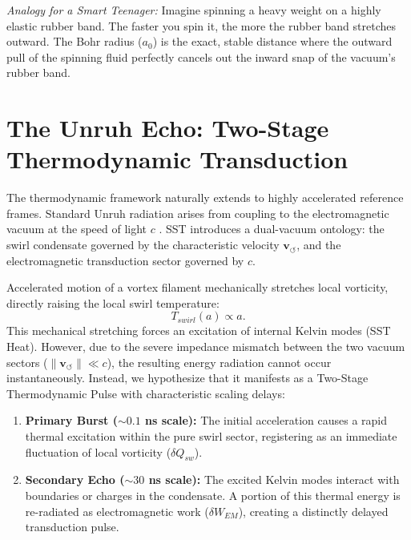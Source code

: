 \documentclass[11pt, a4paper]{article}
\newcommand{\vswirl}{\mathbf{v}_{\!\boldsymbol{\circlearrowleft}}}
\begin{document}
        \emph{Analogy for a Smart Teenager:} Imagine spinning a heavy weight on a highly elastic rubber band. The faster you spin it, the more the rubber band stretches outward. The Bohr radius ($a_0$) is the exact, stable distance where the outward pull of the spinning fluid perfectly cancels out the inward snap of the vacuum's rubber band.

        \section{The Unruh Echo: Two-Stage Thermodynamic Transduction}
        \label{sec:unruh_echo}
        
        The thermodynamic framework naturally extends to highly accelerated reference frames. Standard Unruh radiation arises from coupling to the electromagnetic vacuum at the speed of light $c$ \cite{Unruh1976}. SST introduces a dual-vacuum ontology: the swirl condensate governed by the characteristic velocity $\vswirl$, and the electromagnetic transduction sector governed by $c$.
        
        Accelerated motion of a vortex filament mechanically stretches local vorticity, directly raising the local swirl temperature:
        \begin{equation}
            T_{swirl}(a) \propto a.
        \end{equation}
        This mechanical stretching forces an excitation of internal Kelvin modes (SST Heat). However, due to the severe impedance mismatch between the two vacuum sectors ($\lVert \vswirl \rVert \ll c$), the resulting energy radiation cannot occur instantaneously. Instead, we hypothesize that it manifests as a Two-Stage Thermodynamic Pulse with characteristic scaling delays:
        \begin{enumerate}
            \item \textbf{Primary Burst ($\sim 0.1$ ns scale):} The initial acceleration causes a rapid thermal excitation within the pure swirl sector, registering as an immediate fluctuation of local vorticity ($\delta Q_{sw}$).
            \item \textbf{Secondary Echo ($\sim 30$ ns scale):} The excited Kelvin modes interact with boundaries or charges in the condensate. A portion of this thermal energy is re-radiated as electromagnetic work ($\delta W_{EM}$), creating a distinctly delayed transduction pulse.
        \end{enumerate}
        
\end{document}
